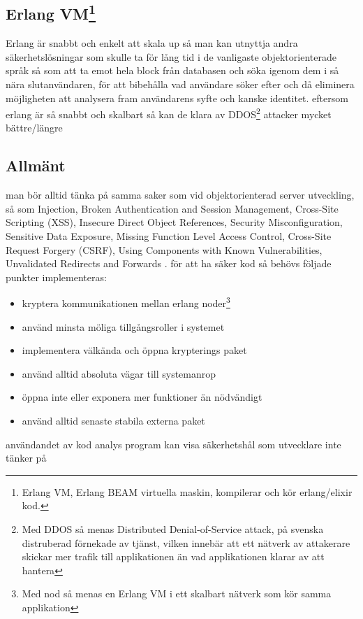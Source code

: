 \documentclass[12pt]{article}
\begin{document}
\subsection*{Erlang VM\footnote{Erlang VM, Erlang BEAM virtuella maskin, kompilerar och kör erlang/elixir kod\cite{erlang}.}}
	Erlang är snabbt och enkelt att skala up så man kan utnyttja andra säkerhetslösningar som skulle ta för lång tid i de vanligaste objektorienterade språk  så som att ta emot hela block från databasen och söka igenom dem i så nära slutanvändaren, för att bibehålla vad användare söker efter och då eliminera möjligheten att analysera fram användarens syfte och kanske identitet\cite{database}. eftersom erlang är så snabbt och skalbart så kan de klara av DDOS\footnote{Med DDOS så menas Distributed Denial-of-Service attack, på svenska distruberad förnekade av tjänst, vilken innebär att ett nätverk av attakerare skickar mer trafik till applikationen än vad applikationen klarar av att hantera} attacker mycket bättre/längre\cite{resource-safe}
\subsection*{Allmänt}
	man bör alltid tänka på samma saker som vid objektorienterad server utveckling, så som Injection, Broken Authentication and Session Management, Cross-Site Scripting (XSS), Insecure Direct Object References, Security Misconfiguration, Sensitive Data Exposure, Missing Function Level Access Control, Cross-Site Request Forgery (CSRF), Using Components with Known Vulnerabilities, Unvalidated Redirects and Forwards \cite{owasp}.
	för att ha säker kod så behövs följade punkter implementeras:
	\begin{itemize} 
		\item kryptera kommunikationen mellan erlang noder\footnote{Med nod så menas en Erlang VM i ett skalbart nätverk som kör samma applikation}
		\item använd minsta möliga tillgångsroller i systemet
		\item implementera välkända och öppna krypterings paket
		\item använd alltid absoluta vägar till systemanrop
		\item öppna inte eller exponera mer funktioner än nödvändigt
		\item använd alltid senaste stabila externa paket
	\end{itemize}
användandet av kod analys program kan visa säkerhetshål som utvecklare inte tänker på
\end{document}
